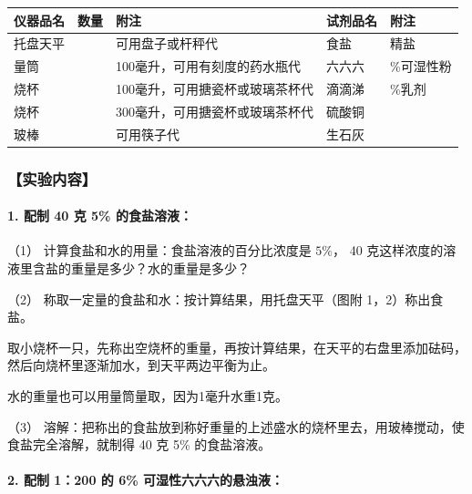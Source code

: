 {\def\LTcaptype{none}\footnotesize\setlength{\tabcolsep}{3pt}%
\begin{longtable}[]{@{}
  >{\raggedright\arraybackslash}p{}
  >{\centering\arraybackslash}p{}
  >{\raggedright\arraybackslash}p{}
  >{\raggedright\arraybackslash}p{}
  >{\raggedright\arraybackslash}p{}@{}}
\toprule\noalign{}
仪器品名 & 数量 & 附注 & 试剂品名 & 附注 \\
\midrule\noalign{}
\endhead
\bottomrule\noalign{}
\endlastfoot
托盘天平 & 1 & 可用盘子或杆秤代 & 食盐 & 精盐 \\
量筒 & 1 & 100毫升，可用有刻度的药水瓶代 & 六六六 & 6\%可湿性粉 \\
烧杯 & 2 & 100毫升，可用搪瓷杯或玻璃茶杯代 & 滴滴涕 & 25\%乳剂 \\
烧杯 & 1 & 300毫升，可用搪瓷杯或玻璃茶杯代 & 硫酸铜 & \\
玻棒 & 1 & 可用筷子代 & 生石灰 & \\
\end{longtable}
}

\subsubsection{【实验内容】}

\paragraph{1. 配制 40 克 5\% 的食盐溶液：}

（1） 计算食盐和水的用量：食盐溶液的百分比浓度是 \(5\%\)， 40
克这样浓度的溶液里含盐的重量是多少？水的重量是多少？

（2） 称取一定量的食盐和水：按计算结果，用托盘天平（图附
1，2）称出食盐。

取小烧杯一只，先称出空烧杯的重量，再按计算结果，在天平的右盘里添加砝码，然后向烧杯里逐渐加水，到天平两边平衡为止。

水的重量也可以用量筒量取，因为1毫升水重1克。

（3）
溶解：把称出的食盐放到称好重量的上述盛水的烧杯里去，用玻棒搅动，使食盐完全溶解，就制得
40 克 5\% 的食盐溶液。

\paragraph{2. 配制 1：200 的 6\% 可湿性六六六的悬浊液：}

